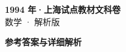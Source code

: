 \documentclass[zihao=-4, a4paper]{ctexart}
\begin{document}
\begin{center}
  {\Large\bfseries 1994 年·上海试点教材文科卷}\\[4pt]
  {\large 数学 · 解析版}
\end{center}
\medskip
{}

\clearpage
{}
\begin{center}{\Large\bfseries 参考答案与详细解析}\end{center}
\medskip

\end{document}
